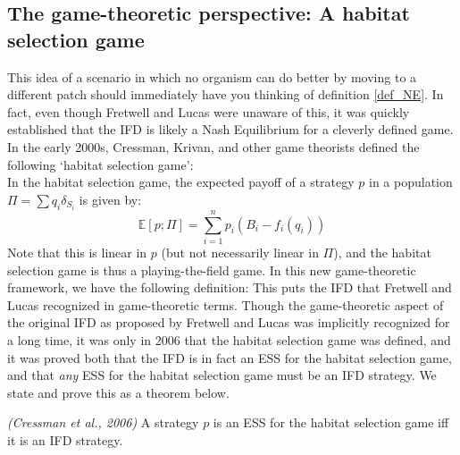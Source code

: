 \subsection{The game-theoretic perspective: A habitat selection game}
This idea of a scenario in which no organism can do better by moving to a different patch should immediately have you thinking of definition \ref{def_NE}. In fact, even though Fretwell and Lucas were unaware of this, it was quickly established that the IFD is likely a Nash Equilibrium for a cleverly defined game. In the early 2000s, Cressman, Krivan, and other game theorists defined the following `habitat selection game':
\\
In the habitat selection game, the expected payoff of a strategy $p$ in a population $\Pi=\sum q_i\delta_{S_i}$ is given by:
\begin{equation}
	\label{IFD_exp_payoff}
	\mathbb{E}[p;\Pi] = \sum\limits_{i=1}^{n}p_i(B_i-f_i(q_i))
\end{equation}
Note that this is linear in $p$ (but not necessarily linear in $\Pi$), and the habitat selection game is thus a playing-the-field game. In this new game-theoretic framework, we have the following definition:
This puts the IFD that Fretwell and Lucas recognized in game-theoretic terms. Though the game-theoretic aspect of the original IFD as proposed by Fretwell and Lucas was implicitly recognized for a long time, it was only in 2006 that the habitat selection game was defined, and it was proved both that the IFD is in fact an ESS for the habitat selection game, and that \textit{any} ESS for the habitat selection game must be an IFD strategy. We state and prove this as a theorem below.
\begin{theorem}\emph{(Cressman \textit{et al.}, 2006)}\label{theorem_original_IFD}
	A strategy $p$ is an ESS for the habitat selection game iff it is an IFD strategy.
\end{theorem}
